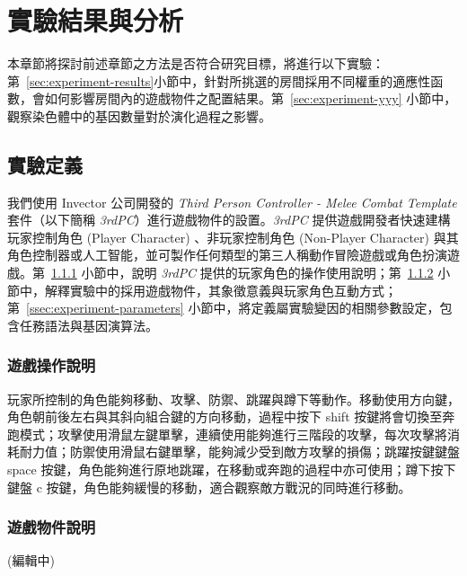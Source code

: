 \renewcommand\thetable{\arabic{chapter}-\arabic{table}}
\chapter{實驗結果與分析}
\label{cha:experiment}

本章節將探討前述章節之方法是否符合研究目標，將進行以下實驗：第~\ref{sec:experiment-results}小節中，針對所挑選的房間採用不同權重的適應性函數，會如何影響房間內的遊戲物件之配置結果。第~\ref{sec:experiment-yyy} 小節中，觀察染色體中的基因數量對於演化過程之影響。

\section{實驗定義}
\label{sec:experiment-definition}

我們使用 Invector 公司開發的 \textit{Third Person Controller - Melee Combat Template} 套件（以下簡稱 \textit{3rdPC}）進行遊戲物件的設置。\textit{3rdPC} 提供遊戲開發者快速建構玩家控制角色 (Player Character) 、非玩家控制角色 (Non-Player Character) 與其角色控制器或人工智能，並可製作任何類型的第三人稱動作冒險遊戲或角色扮演遊戲。第~\ref{ssec:experiment-gameplaymanual} 小節中，說明 \textit{3rdPC} 提供的玩家角色的操作使用說明；第~\ref{ssec:experiment-gameobjects} 小節中，解釋實驗中的採用遊戲物件，其象徵意義與玩家角色互動方式；第~\ref{ssec:experiment-parameters} 小節中，將定義屬實驗變因的相關參數設定，包含任務語法與基因演算法。

\subsection{遊戲操作說明}
\label{ssec:experiment-gameplaymanual}

玩家所控制的角色能夠移動、攻擊、防禦、跳躍與蹲下等動作。移動使用方向鍵，角色朝前後左右與其斜向組合鍵的方向移動，過程中按下 shift 按鍵將會切換至奔跑模式；攻擊使用滑鼠左鍵單擊，連續使用能夠進行三階段的攻擊，每次攻擊將消耗耐力值；防禦使用滑鼠右鍵單擊，能夠減少受到敵方攻擊的損傷；跳躍按鍵鍵盤 space 按鍵，角色能夠進行原地跳躍，在移動或奔跑的過程中亦可使用；蹲下按下鍵盤 c 按鍵，角色能夠緩慢的移動，適合觀察敵方戰況的同時進行移動。

\subsection{遊戲物件說明}
\label{ssec:experiment-gameobjects}

(編輯中)

